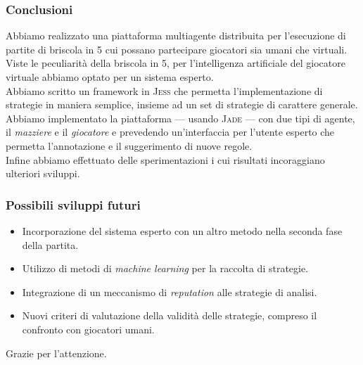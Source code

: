 \documentclass{beamer}
\newcommand*\lista{\item[$\diamondsuit$]}
\begin{document}

\begin{frame}
   \frametitle{Conclusioni}
   Abbiamo realizzato una piattaforma multiagente distribuita per l'esecuzione di partite di briscola in 5 cui possano partecipare giocatori sia umani che virtuali.\\
   Viste le peculiarità della briscola in 5, per l'intelligenza artificiale del giocatore virtuale abbiamo optato per un sistema esperto.\\
   Abbiamo scritto un framework in \textsc{Jess} che permetta l'implementazione di strategie in maniera semplice, insieme ad un set di strategie di carattere generale.\\
   Abbiamo implementato la piattaforma --- usando \textsc{Jade} --- con due tipi di agente, il \emph{mazziere} e il \emph{giocatore} e prevedendo un'interfaccia per l'utente esperto che permetta l'annotazione e il suggerimento di nuove regole.\\
   Infine abbiamo effettuato delle sperimentazioni i cui risultati incoraggiano ulteriori sviluppi.   
\end{frame}


\begin{frame}
   \frametitle{Possibili sviluppi futuri}
   \begin{itemize}
      \lista Incorporazione del sistema esperto con un altro metodo nella seconda fase della partita.
      \lista Utilizzo di metodi di \emph{machine learning} per la raccolta di strategie.
      \lista Integrazione di un meccanismo di \emph{reputation} alle strategie di analisi.
      \lista Nuovi criteri di valutazione della validità delle strategie, compreso il confronto con giocatori umani.
   \end{itemize}
   
\end{frame}


\begin{frame}
   \centering
   Grazie per l'attenzione.
\end{frame}
\end{document}

